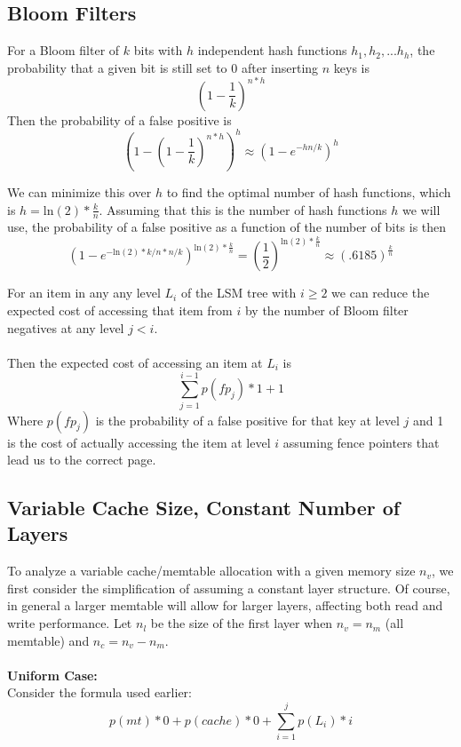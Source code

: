 \documentclass{sig-alternate-05-2015}
\begin{document}
\subsection{Bloom Filters}

For a Bloom filter of $k$ bits with $h$ independent hash functions $h_1, h_2,...h_h$, the probability that a given bit is still set to 0 after inserting $n$ keys is 
$$
(1 - \frac{1}{k})^{n*h}
$$
Then the probability of a false positive is 
$$
(1- (1 - \frac{1}{k})^{n*h})^h \approx (1 - e^{-hn/k})^h
$$

We can minimize this over $h$ to find the optimal number of hash functions, which is $h = \mathrm{ln}(2) * \frac{k}{n}$. Assuming that this is the number of hash functions $h$ we will use, the probability of a false positive as a function of the number of bits is then 
$$
(1 - e^{-\mathrm{ln}(2)*k/n*n/k})^{\mathrm{ln}(2) * \frac{k}{n}} = (\frac{1}{2}) ^ {\mathrm{ln}(2) * \frac{k}{n}} \approx (.6185) ^  {\frac{k}{n}}
$$

For an item in any any level $L_i$ of the LSM tree with $i \geq 2$ we can reduce the expected cost of accessing that item from $i$ by the number of Bloom filter negatives at any level $j<i$. \\ \\
Then the expected cost of accessing an item at $L_i$ is  $$\sum_{j=1}^{i-1} p(fp_j) * 1 + 1$$
Where $p(fp_j)$ is the probability of a false positive for that key at level $j$ and 1 is the cost of actually accessing the item at level $i$ assuming fence pointers that lead us to the correct page.

\subsection{Variable Cache Size, Constant Number of Layers}
To analyze a variable cache/memtable allocation with a given memory size $n_v$, we first consider the simplification of assuming a constant layer structure. Of course, in general a larger memtable will allow for larger layers, affecting both read and write performance. Let $n_l$ be the size of the first layer when $n_v = n_m$ (all memtable) and $n_c =n_v - n_m$.\\ \\
\textbf{Uniform Case:} \\
Consider the formula used earlier:
$$
p(mt) * 0  + p(cache) * 0 + \sum_{i=1}^j p(L_i) * i 
$$
\end{document}
